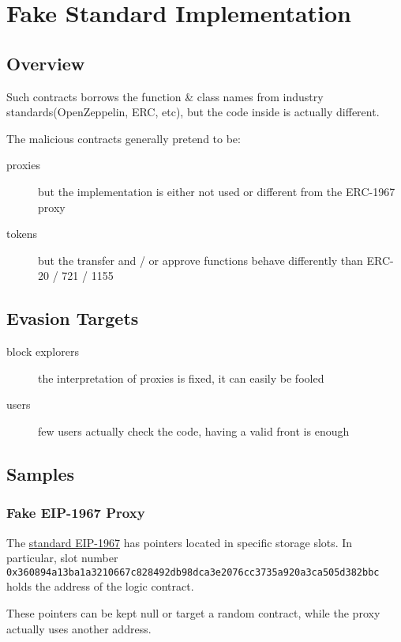 \section{Fake Standard Implementation} \label{sec:fake-implementation}

\subsection{Overview}

Such contracts borrows the function \& class names from industry standards(OpenZeppelin, ERC, etc), but the code inside is actually different.

The malicious contracts generally pretend to be:

\begin{description}
\item[proxies]{but the implementation is either not used or different from the ERC-1967 proxy}
\item[tokens]{but the transfer and / or approve functions behave differently than ERC-20 / 721 / 1155}
\end{description}

\subsection{Evasion Targets}

\begin{description}
\item[block explorers]{the interpretation of proxies is fixed, it can easily be fooled}
\item[users]{few users actually check the code, having a valid front is enough}
\end{description}

\subsection{Samples}

\subsubsection{Fake EIP-1967 Proxy}

The \href{\urlstandardeipproxy}{standard EIP-1967} has pointers located in specific storage slots.
In particular, slot number \lstinline{0x360894a13ba1a3210667c828492db98dca3e2076cc3735a920a3ca505d382bbc} holds the address of the logic contract.

These pointers can be kept null or target a random contract, while the proxy actually uses another address.

